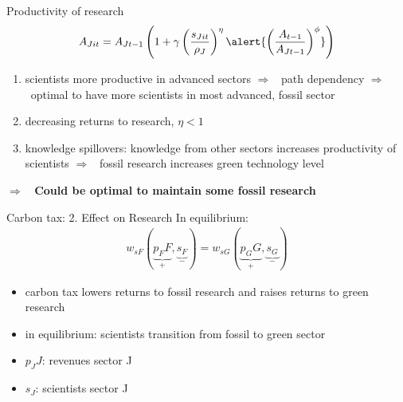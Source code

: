 \documentclass[11pt,aspectratio=169]{beamer}
\newcommand{\ar}{$\Rightarrow$ \ }
\begin{document}
\addtocounter{framenumber}{-1}
\begin{frame}{Productivity of research}
	\large
	\begin{align*}
		A_{Jit}={A_{Jt-1}}\left(1+\gamma\left(\frac{s_{Jit}}{\rho_J}\right)^\eta\alert{\left(\frac{A_{t-1}}{A_{Jt-1}}\right)^\phi}\right)
	\end{align*}
	\normalsize
	\begin{enumerate}
		\item scientists more productive in advanced sectors \ar path dependency \ar optimal to have more scientists in most advanced, fossil sector 
		\item decreasing returns to research, $\eta<1$
		\item {knowledge spillovers:} knowledge from other sectors increases productivity of scientists
		\ar fossil research increases green technology level	
	\end{enumerate}
\alert{\textbf{\ar Could be optimal to maintain some fossil research}}
\end{frame}

\begin{frame}{Carbon tax: 2. Effect on Research}
	\vspace{-7mm}
	In equilibrium: \large
	\begin{align*}
		w_{sF}\left(\underbrace{p_FF}_{+},\underbrace{s_F}_{-}\right)=		w_{sG}\left(\underbrace{p_GG}_{+},\underbrace{s_G}_{-}\right)
	\end{align*}
	\normalsize
	\begin{itemize}
		\item carbon tax lowers returns to fossil research and raises returns to green research
		\item in equilibrium: scientists transition from fossil to green sector
	\end{itemize}
	\small
	\vspace{0mm}
	\hspace{-4mm}
	\begin{minipage}[t!]{0.3\textwidth}
		\vspace{0mm}
		\begin{itemize}
			\item[] $p_JJ$: revenues sector J
		\end{itemize}
	\end{minipage}
	\vspace{-5mm}
	\begin{minipage}[t!]{0.5\textwidth}
		\vspace{0mm}
		\begin{itemize}	
			\item[] $s_J$: scientists sector J
		\end{itemize}
	\end{minipage}
\end{frame}
\end{document}
